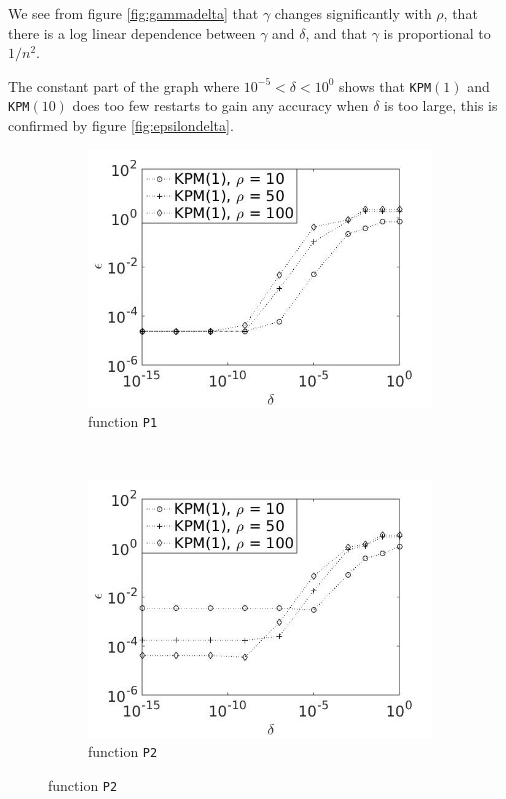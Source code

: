 We see from figure \ref{fig:gammadelta} that $\gamma$ changes significantly with $\rho$, that there is a log linear dependence between $\gamma$ and $\delta$, and that $\gamma$ is proportional to $1/n^2$. 

The constant part of the graph where $ 10^{-5}<\delta< {10^0} $ shows that \texttt{KPM}$(1)$ and \texttt{KPM}$(10)$ does too few restarts to gain any accuracy when $\delta$ is too large, this is confirmed by figure \ref{fig:epsilondelta}. 

\begin{figure}[H]
        \centering
        \begin{subfigure}[b]{0.45\textwidth}
                \includegraphics[width=\textwidth]{fig/s15errvstol1m}
                \caption{function \texttt{P1}}
                \label{fig:epsilondelta1}
        \end{subfigure}
~
        \begin{subfigure}[b]{0.45\textwidth}
                \includegraphics[width=\textwidth]{fig/s16errvstol2m}
                \caption{ function \texttt{P2}}
                \label{fig:epsilondelta2}
        \end{subfigure}
        

\end{figure}
